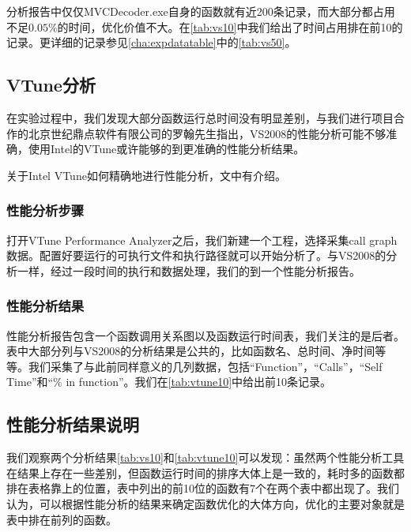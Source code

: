 

分析报告中仅仅MVCDecoder.exe自身的函数就有近200条记录，而大部分都占用不足$0.05\%$的时间，优化价值不大。在\autoref{tab:vs10}中我们给出了时间占用排在前10的记录。更详细的记录参见\autoref{cha:expdatatable}中的\autoref{tab:vs50}。

\subsection{VTune分析}
\label{subsec:vtuneprofiling}

在实验过程中，我们发现大部分函数运行总时间没有明显差别，与我们进行项目合作的北京世纪鼎点软件有限公司的罗翰先生指出，VS2008的性能分析可能不够准确，使用Intel的VTune或许能够的到更准确的性能分析结果。

关于Intel VTune如何精确地进行性能分析，文中有介绍。

\subsubsection{性能分析步骤}
\label{subsubsec:profilingprocess}

打开VTune Performance Analyzer之后，我们新建一个工程，选择采集call graph数据。配置好要运行的可执行文件和执行路径就可以开始分析了。与VS2008的分析一样，经过一段时间的执行和数据处理，我们的到一个性能分析报告。

\subsubsection{性能分析结果}
\label{subsubsec:reportexerpt}



性能分析报告包含一个函数调用关系图以及函数运行时间表，我们关注的是后者。表中大部分列与VS2008的分析结果是公共的，比如函数名、总时间、净时间等等。我们采集了与此前同样意义的几列数据，包括“Function”，“Calls”，“Self Time”和“\% in function”。我们在\autoref{tab:vtune10}中给出前10条记录。

\subsection{性能分析结果说明}
\label{subsec:commentonreport}

我们观察两个分析结果\autoref{tab:vs10}和\autoref{tab:vtune10}可以发现：虽然两个性能分析工具在结果上存在一些差别，但函数运行时间的排序大体上是一致的，耗时多的函数都排在表格靠上的位置，表中列出的前10位的函数有7个在两个表中都出现了。我们认为，可以根据性能分析的结果来确定函数优化的大体方向，优化的主要对象就是表中排在前列的函数。

